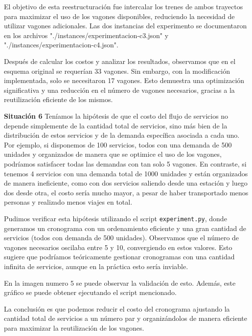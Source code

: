 \documentclass{article}
\begin{document}
    El objetivo de esta reestructuración fue intercalar los trenes de ambos trayectos para maximizar el uso de los vagones disponibles, reduciendo la necesidad de utilizar vagones adicionales. Las dos instancias del experimento se documentaron en los archivos "./instances/experimentacion-c3.json" y "./instances/experimentacion-c4.json".

    Después de calcular los costos y analizar los resultados, observamos que en el esquema original se requerían 33 vagones. Sin embargo, con la modificación implementada, solo se necesitaron 17 vagones. Esto demuestra una optimización significativa y una reducción en el número de vagones necesarios, gracias a la reutilización eficiente de los mismos.
\vspace{0.5cm}

\textbf{Situación 6}
\newline
    Teníamos la hipótesis de que el costo del flujo de servicios no depende simplemente de la cantidad total de servicios, sino más bien de la distribución de estos servicios y de la demanda específica asociada a cada uno. Por ejemplo, si disponemos de 100 servicios, todos con una demanda de 500 unidades y organizados de manera que se optimice el uso de los vagones, podríamos satisfacer todas las demandas con tan solo 5 vagones. En contraste, si tenemos 4 servicios con una demanda total de 1000 unidades y están organizados de manera ineficiente, como con dos servicios saliendo desde una estación y luego dos desde otra, el costo sería mucho mayor, a pesar de haber transportado menos personas y realizado menos viajes en total.

    Pudimos verificar esta hipótesis utilizando el script \texttt{experiment.py}, donde generamos un cronograma con un ordenamiento eficiente y una gran cantidad de servicios (todos con demanda de 500 unidades). Observamos que el número de vagones necesarios oscilaba entre 5 y 10, convergiendo en estos valores. Esto sugiere que podríamos teóricamente gestionar cronogramas con una cantidad infinita de servicios, aunque en la práctica esto sería inviable.

    En la imagen numero 5 se puede observar la validación de esto. Además, este gráfico se puede obtener ejecutando el script mencionado.

    La conclusión es que podemos reducir el costo del cronograma ajustando la cantidad total de servicios a un número par y organizándolos de manera eficiente para maximizar la reutilización de los vagones.
\end{document}
